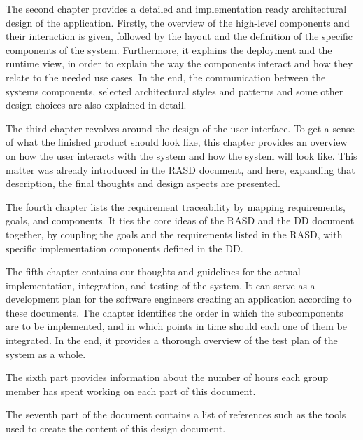 The second chapter provides a detailed and implementation ready architectural design of the application. Firstly, the overview of the high-level components and their interaction is given, followed by the layout and the definition of the specific components of the system. Furthermore, it explains the deployment and the runtime view, in order to explain the way the components interact and how they relate to the needed use cases. In the end, the communication between the systems components, selected architectural styles and patterns and some other design choices are also explained in detail. \newline

The third chapter revolves around the design of the user interface. To get a sense of what the finished product should look like, this chapter provides an overview on how the user interacts with the system and how the system will look like. This matter was already introduced in the RASD document, and here, expanding that description, the final thoughts and design aspects are presented. \newline

The fourth chapter lists the requirement traceability by mapping requirements, goals, and components. It ties the core ideas of the RASD and the DD document together, by coupling the goals and the requirements listed in the RASD, with specific implementation components defined in the DD. \newline 

The fifth chapter contains our thoughts and guidelines for the actual implementation, integration, and testing of the system. It can serve as a development plan for the software engineers creating an application according to these documents. The chapter identifies the order in which the subcomponents are to be implemented, and in which points in time should each one of them be integrated. In the end, it provides a thorough overview of the test plan of the system as a whole. \newline

The sixth part provides information about the number of hours each group member has spent working on each part of this document. \newline

The seventh part of the document contains a list of references such as the tools used to create the content of this design document. \newline
